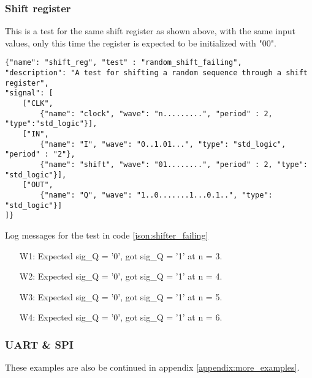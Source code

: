 \subsubsection{Shift register}
This is a test for the same shift register as shown above, with the same input values, only this time the register is expected to be initialized with "00".
\begin{lstlisting}[style=json, caption={Failing functionality test for the shifter design in appendix \ref{appendix:shifter}}, label={json:shifter_failing}]
{"name": "shift_reg", "test" : "random_shift_failing", 
"description": "A test for shifting a random sequence through a shift register", 
"signal": [
	["CLK",
		{"name": "clock", "wave": "n.........", "period" : 2, "type":"std_logic"}],
	["IN",
		{"name": "I", "wave": "0..1.01...", "type": "std_logic", "period" : "2"},
		{"name": "shift", "wave": "01........", "period" : 2, "type": "std_logic"}],
	["OUT",
		{"name": "Q", "wave": "1..0.......1...0.1..", "type": "std_logic"}]
]}
\end{lstlisting}
\begin{customenv}
	\caption{Log messages for the test in code \ref{json:shifter_failing}}
	\begin{itemize}
		\centering
		\item [W1:] Expected sig\_Q =  '0',  got sig\_Q =  '1' at n = 3.
		\item [W2:] Expected sig\_Q =  '0',  got sig\_Q =  '1' at n = 4.
		\item [W3:] Expected sig\_Q =  '0',  got sig\_Q =  '1' at n = 5.
		\item [W4:] Expected sig\_Q =  '0',  got sig\_Q =  '1' at n = 6.
	\end{itemize}
\end{customenv}
\newpage
\subsubsection{UART \& SPI}
These examples are also be continued in appendix \ref{appendix:more_examples}.
